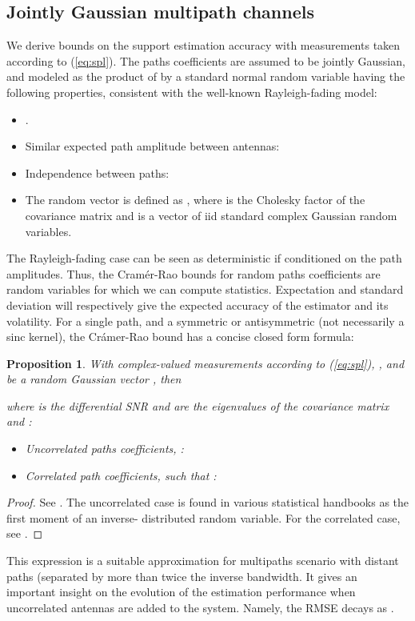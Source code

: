 \documentclass[journal,10pt]{IEEEtran}
\newtheorem{proposition}{Proposition}
\begin{document}
\subsection{Jointly Gaussian multipath channels}
We derive bounds on the support estimation accuracy with measurements taken according to (\ref{eq:spl}). The paths coefficients  are assumed to be jointly Gaussian, and modeled as the product of  by a standard normal random variable   having the following properties, consistent with the well-known Rayleigh-fading model:
\begin{itemize}
\item .
\item Similar expected path amplitude between antennas: 
\item Independence between paths: 
\item The random vector  is defined as
,
where  is the Cholesky factor of the covariance matrix  and  is a vector of iid standard complex Gaussian random variables.
\end{itemize}
The Rayleigh-fading case can be seen as deterministic  if conditioned  on the path amplitudes. Thus, the Cram\'er-Rao bounds for random paths coefficients are random variables for which we can compute statistics. Expectation and standard deviation will respectively give the expected accuracy of the estimator and its volatility.
For a single path, and a symmetric or antisymmetric  (not necessarily a sinc kernel), the Cr\'amer-Rao bound has a concise closed form formula:
\begin{proposition}\label{prop:crbp}
With complex-valued measurements according to (\ref{eq:spl}), , and  be a random Gaussian vector , then

where  is the differential SNR and  are the eigenvalues of the covariance matrix  and :
\begin{itemize}
\item Uncorrelated paths coefficients, :

\item Correlated path coefficients, such that :

\end{itemize}
\end{proposition}\begin{proof}See \cite{Barbotin2010}. The uncorrelated case is found in various statistical handbooks as the first moment of an inverse- distributed random variable. For the correlated case, see \cite{Thomas1976}.\end{proof}
This expression is a suitable approximation for multipaths  scenario with distant paths (separated by more than twice the inverse bandwidth.
It gives an important insight on the evolution of the estimation performance when uncorrelated antennas are added to the system. Namely, the RMSE decays as .
\end{document}
